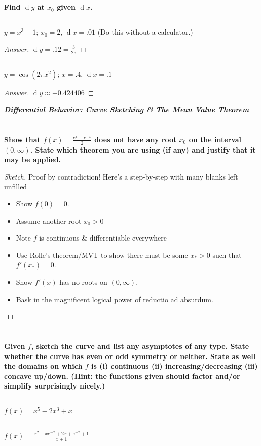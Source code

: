 \documentclass[english,fleqn]{article}
\renewcommand{\d}[1]{\ensuremath{\operatorname{d}\!{#1}}}
\newcommand{\prob}[1]{\setcounter{section}{#1-1}\section{}}
\newcommand{\prt}[1]{\setcounter{subsection}{#1-1}\subsection{}}
\theoremstyle{remark}
\theoremstyle{definition}
\newcommand{\ild}[1]{\displaystyle{#1}}
\begin{document}
		\prob{7} \textbf{Find $\d y$ at $x_0$ given $\d x$.}
		\prt{1} $y=x^3+1$; $x_0=2$, $\d x=.01$ (Do this without a calculator.)%
		\begin{proof}[Answer]
			$\d y=.12=\frac{3}{25}$
			\end{proof}
		\prt{2} $y=\cos{(2\pi x^2)}$; $x=.4$, $\d x=.1$
		\begin{proof}[Answer]
			$\d y \approx -0.424406$
		\end{proof}
\newpage
		\begin{center}
			{\Large\textbf{\emph{Differential Behavior: Curve Sketching \& The Mean Value Theorem}}}\end{center}
			\prob{8} \textbf{Show that $f(x)=\frac{e^x-e^{-x}}{2}$ does not have any root $x_0$ on the interval $(0,\infty)$. State which theorem you are using (if any) and justify that it may be applied.}%
			\begin{proof}[Sketch]
				Proof by contradiction! Here's a step-by-step with many blanks left unfilled \begin{itemize}
				\item Show $f(0)=0$.
				\item Assume another root $x_0>0$
				\item Note $f$ is continuous \& differentiable everywhere
				\item Use Rolle's theorem/MVT to show there must be some $x_*>0$ such that $f'(x_*)=0$.
				\item Show $f'(x)$ has no roots on $(0,\infty)$.
				\item Bask in the magnificent logical power of reductio ad absurdum.
				\end{itemize}
			\end{proof}
			\prob{9}\textbf{Given $f$, sketch the curve and list any asymptotes of any type. State whether the curve has even or odd symmetry or neither. State as well the domains on which $f$ is (i) continuous (ii) increasing/decreasing (iii) concave up/down. (Hint: the functions given should factor and/or simplify surprisingly nicely.)}\prt{1}
			$\ild{f(x)=x^5-2x^3+x}$ %
			\prt{2} $\ild{f(x)=\frac{x^2+xe^{-x}+2x+e^{-x}+1}{x+1}}$%
			
\end{document}
